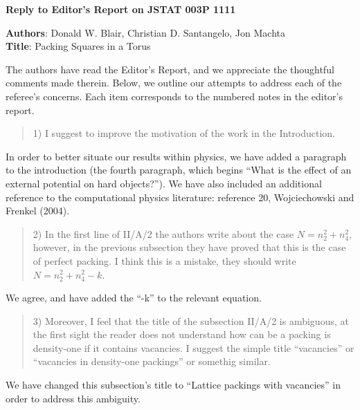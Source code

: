 \documentclass[12pt]{article}
\begin{document}
\setlength{\parindent}{0.0in}
\setlength{\parskip}{4mm}

{\bf Reply to Editor's Report on JSTAT 003P 1111}

{\bf Authors}: Donald W. Blair, Christian D. Santangelo, Jon Machta \\
{\bf Title}: Packing Squares in a Torus

\setlength{\parskip}{4mm}
The authors have read the Editor's Report, and we appreciate the thoughtful comments made therein.  Below, we outline our attempts to address each of the referee's concerns.  Each item corresponds to the numbered notes in the editor's report.

\begin{quote} 
1) I suggest to improve the motivation of the work in the Introduction.
\end{quote}
In order to better situate our results within physics, we have added a paragraph to the introduction (the fourth paragraph, which begins ``What is the effect of an external potential on hard objects?'').  We have also included an additional reference to the computational physics literature: reference 20, Wojciechowski and Frenkel (2004). 


\begin{quote} 
2) In the first line of II/A/2 the authors write about the case $N=n_2^2+n_4^2$, however, in the previous subsection they have proved that this is the case of perfect packing. I think this is a mistake, they should write $N=n_2^2+n_4^2-k$.
\end{quote}

We agree, and have added the ``-k'' to the relevant equation.

\begin{quote}
3) Moreover, I feel that the title of the subsection II/A/2 is ambiguous, at the first sight the reader does not understand how can be a packing is density-one if it contains vacancies. I suggest the simple title ``vacancies'' or ``vacancies in density-one packings'' or somethig similar.
\end{quote}

We have changed this subsection's title to ``Lattice packings with vacancies'' in order to address this ambiguity.
\end{document}
